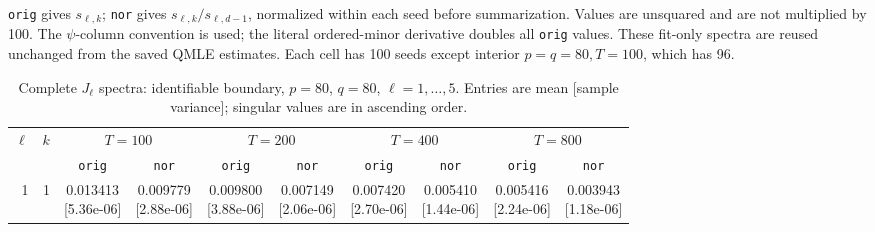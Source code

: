 \documentclass[12pt,letterpaper]{article}
\def\spacingset#1{\renewcommand{\baselinestretch}{#1}\small\normalsize}
\theoremstyle{plain}
\theoremstyle{definition}
\begin{document}
\begin{table}[p]
\begin{adjustbox}{max width=\linewidth}
\begin{tabular}{@{}rr*{8}{c}@{}}
\bottomrule
\end{tabular}
\end{adjustbox}
\par\smallskip
\begin{minipage}{0.98\linewidth}\footnotesize
\texttt{orig} gives $s_{\ell,k}$; \texttt{nor} gives $s_{\ell,k}/s_{\ell,d-1}$, normalized within each seed before summarization. Values are unsquared and are not multiplied by 100. The $\psi$-column convention is used; the literal ordered-minor derivative doubles all \texttt{orig} values. These fit-only spectra are reused unchanged from the saved QMLE estimates. Each cell has 100 seeds except interior $p=q=80,T=100$, which has 96.
\end{minipage}
\endgroup
\end{table}
\clearpage
\begin{table}[p]
\begingroup
\spacingset{1.0}
\small\centering
\caption{Complete $J_\ell$ spectra: identifiable boundary, $p=80$, $q=80$, $\ell=1,\ldots,5$. Entries are mean [sample variance]; singular values are in ascending order.}
\label{s23:lambda:alltab:spectra:p80q80boundary:1-5}
\footnotesize
\setlength{\tabcolsep}{2.2pt}
\renewcommand{\arraystretch}{1.03}
\begin{adjustbox}{max width=\linewidth}
\begin{tabular}{@{}rr*{8}{c}@{}}
\toprule
$\ell$ & $k$ & \multicolumn{2}{c}{$T=100$} & \multicolumn{2}{c}{$T=200$} & \multicolumn{2}{c}{$T=400$} & \multicolumn{2}{c}{$T=800$}\\
\cmidrule(lr){3-4}\cmidrule(lr){5-6}\cmidrule(lr){7-8}\cmidrule(lr){9-10}
 &  & \texttt{orig} & \texttt{nor} & \texttt{orig} & \texttt{nor} & \texttt{orig} & \texttt{nor} & \texttt{orig} & \texttt{nor}\\
\midrule
1 & 1 & \shortstack{0.013413\\[-1pt]{\scriptsize[5.36e-06]}} & \shortstack{0.009779\\[-1pt]{\scriptsize[2.88e-06]}} & \shortstack{0.009800\\[-1pt]{\scriptsize[3.88e-06]}} & \shortstack{0.007149\\[-1pt]{\scriptsize[2.06e-06]}} & \shortstack{0.007420\\[-1pt]{\scriptsize[2.70e-06]}} & \shortstack{0.005410\\[-1pt]{\scriptsize[1.44e-06]}} & \shortstack{0.005416\\[-1pt]{\scriptsize[2.24e-06]}} & \shortstack{0.003943\\[-1pt]{\scriptsize[1.18e-06]}}\\

\end{tabular}
\end{adjustbox}
\end{table}
\end{document}
